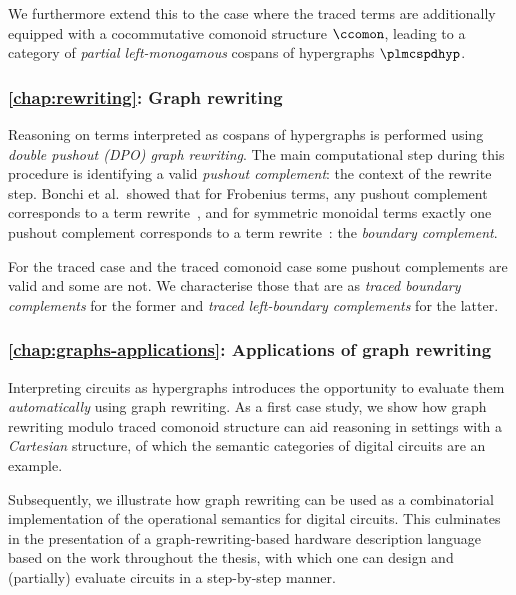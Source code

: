 We furthermore extend this to the case where the traced terms are additionally
equipped with a cocommutative comonoid structure \(\ccomon\), leading to a
category of \emph{partial left-monogamous} cospans of hypergraphs
\(\plmcspdhyp\).

\subsubsection{\cref{chap:rewriting}: Graph rewriting}

Reasoning on terms interpreted as cospans of hypergraphs is performed using
\emph{double pushout (DPO) graph rewriting}.
The main computational step during this procedure is identifying a valid
\emph{pushout complement}: the context of the rewrite step.
Bonchi et al.\ showed that for Frobenius terms, any pushout complement
corresponds to a term rewrite~\cite{bonchi2022string}, and for symmetric
monoidal terms exactly one pushout complement corresponds to a term
rewrite~\cite{bonchi2022stringa}: the \emph{boundary complement}.

For the traced case and the traced comonoid case some pushout complements are
valid and some are not.
We characterise those that are as \emph{traced boundary complements} for the
former and \emph{traced left-boundary complements} for the latter.

\subsubsection{\cref{chap:graphs-applications}: Applications of graph rewriting}

Interpreting circuits as hypergraphs introduces the opportunity to evaluate them
\emph{automatically} using graph rewriting.
As a first case study, we show how graph rewriting modulo traced comonoid
structure can aid reasoning in settings with a \emph{Cartesian} structure, of
which the semantic categories of digital circuits are an example.

Subsequently, we illustrate how graph rewriting can be used as a combinatorial
implementation of the operational semantics for digital circuits.
This culminates in the presentation of a graph-rewriting-based hardware
description language based on the work throughout the thesis, with which one can
design and (partially) evaluate circuits in a step-by-step manner.